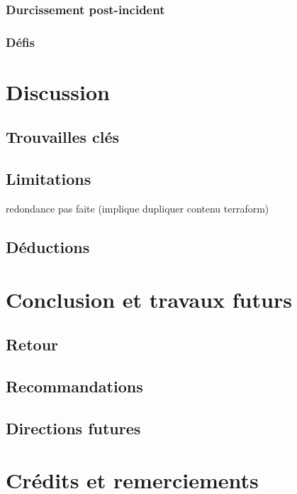 \documentclass[conference]{IEEEtran}
\begin{document}
\subsubsection{Durcissement post-incident}
\subsubsection{Défis}

\section{Discussion}

\subsection{Trouvailles clés}

\subsection{Limitations}
redondance pas faite (implique dupliquer contenu terraform)
\subsection{Déductions}

\section{Conclusion et travaux futurs}

\subsection{Retour}

\subsection{Recommandations}

\subsection{Directions futures}

\section{Crédits et remerciements}
\end{document}
